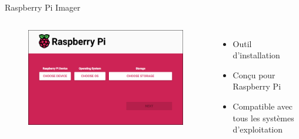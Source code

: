 \documentclass[aspectratio=169,xcolor=dvipsnames]{beamer}
\begin{document}
\begin{frame}{Raspberry Pi Imager}
    \begin{columns}[c] %

        \begin{figure}
            \includegraphics[width=1\textwidth]{images/rpi-imager-0.png}
        \end{figure}

        \begin{itemize}
            \item Outil d'installation
            \item Conçu pour Raspberry Pi
            \item Compatible avec tous les systèmes d'exploitation
        \end{itemize}

    \end{columns}
\end{frame}

\end{document}
